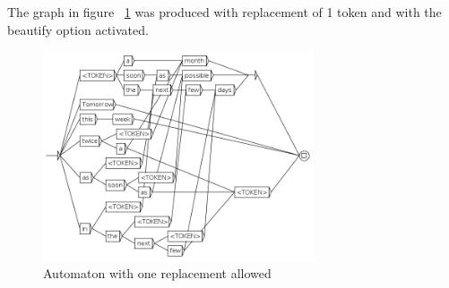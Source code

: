 The graph in figure ~\ref{fig8-7GRF1replace} was produced with replacement of 1 token and with the beautify option activated.
\begin{figure}[h!]
	\begin{center}
		\includegraphics[width=8cm]{resources/img/fig8-7GRF1replace.png}
		\caption{Automaton with one replacement allowed\label{fig8-7GRF1replace}}
	\end{center}
\end{figure}
\bigskip
